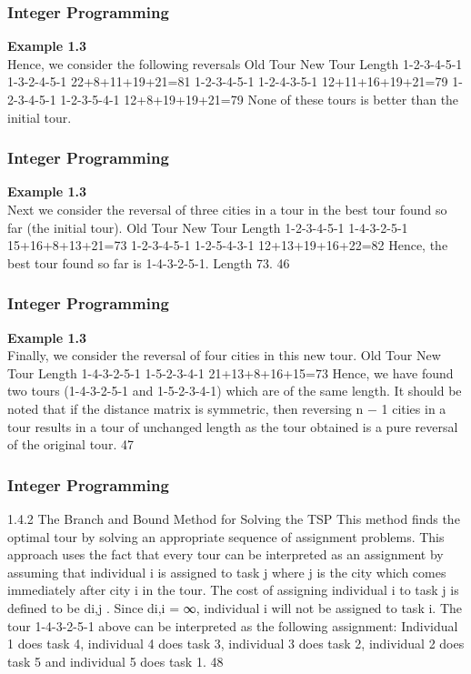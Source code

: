 \begin{frame} 
\frametitle{Integer Programming}     
\noindent \textbf{Example 1.3}\\
Hence, we consider the following reversals
Old Tour New Tour Length
1-2-3-4-5-1 1-3-2-4-5-1 22+8+11+19+21=81
1-2-3-4-5-1 1-2-4-3-5-1 12+11+16+19+21=79
1-2-3-4-5-1 1-2-3-5-4-1 12+8+19+19+21=79
None of these tours is better than the initial tour.
\end{frame}  
\begin{frame} 
\frametitle{Integer Programming}     
\noindent \textbf{Example 1.3}\\
Next we consider the reversal of three cities in a tour in the best
tour found so far (the initial tour).
Old Tour New Tour Length
1-2-3-4-5-1 1-4-3-2-5-1 15+16+8+13+21=73
1-2-3-4-5-1 1-2-5-4-3-1 12+13+19+16+22=82
Hence, the best tour found so far is 1-4-3-2-5-1. Length 73.
46 \end{frame}  \begin{frame} \frametitle{Integer Programming}     
\noindent \textbf{Example 1.3}\\
Finally, we consider the reversal of four cities in this new tour.
Old Tour New Tour Length
1-4-3-2-5-1 1-5-2-3-4-1 21+13+8+16+15=73
Hence, we have found two tours (1-4-3-2-5-1 and 1-5-2-3-4-1)
which are of the same length.
It should be noted that if the distance matrix is symmetric, then
reversing n − 1 cities in a tour results in a tour of unchanged
length as the tour obtained is a pure reversal of the original tour.
47 \end{frame}  
\begin{frame} 
\frametitle{Integer Programming}     
1.4.2 The Branch and Bound Method for Solving the TSP
This method finds the optimal tour by solving an appropriate
sequence of assignment problems.
This approach uses the fact that every tour can be interpreted as
an assignment by assuming that individual i is assigned to task j
where j is the city which comes immediately after city i in the tour.
The cost of assigning individual i to task j is defined to be di,j
.
Since di,i = ∞, individual i will not be assigned to task i.
The tour 1-4-3-2-5-1 above can be interpreted as the following
assignment: Individual 1 does task 4, individual 4 does task 3,
individual 3 does task 2, individual 2 does task 5 and individual 5
does task 1.
48 
\end{frame}  
